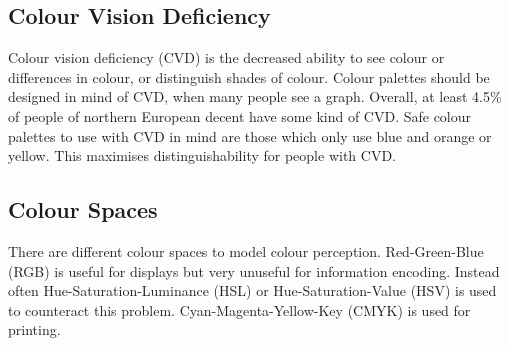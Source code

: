 \subsection{Colour Vision Deficiency}
Colour vision deficiency (CVD) is the decreased ability to see colour or differences in colour, or distinguish shades of colour.
Colour palettes should be designed in mind of CVD, when many people see a graph.
Overall, at least 4.5\% of people of northern European decent have some kind of CVD.
Safe colour palettes to use with CVD in mind are those which only use blue and orange or yellow.
This maximises distinguishability for people with CVD.

\subsection{Colour Spaces}
There are different colour spaces to model colour perception.
Red-Green-Blue (RGB) is useful for displays but very unuseful for information encoding.
Instead often Hue-Saturation-Luminance (HSL) or Hue-Saturation-Value (HSV) is used to counteract this problem.
Cyan-Magenta-Yellow-Key (CMYK) is used for printing.

